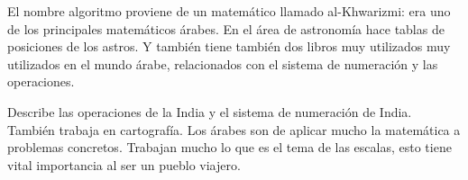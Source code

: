 El nombre algoritmo proviene de un matemático llamado al-Khwarizmi: era uno de los principales matemáticos árabes. En el área de astronomía hace tablas de posiciones de los astros. Y también tiene también dos libros muy utilizados muy utilizados en el mundo árabe, relacionados con el sistema de numeración y las operaciones. 

Describe las operaciones de la India y el sistema de numeración de India. También trabaja en cartografía. Los árabes son de aplicar mucho la matemática a problemas concretos. Trabajan mucho lo que es el tema de las escalas, esto tiene vital importancia al ser un pueblo viajero. 